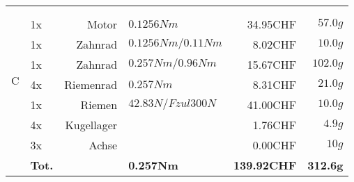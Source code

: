 \begin{longtable}{p{0.5cm}p{0.8cm}rp{3cm}rr}
    \multirow{9}[2]{*}{C} 
          &       &                 &                      &          &  \\
          &       &                 &                      &          &  \\
          & 1x    & Motor           & $0.1256 Nm$          & 34.95CHF & $57.0 g$ \\
          & 1x    & Zahnrad         & $0.1256 Nm / 0.11 Nm$& 8.02CHF  & $10.0 g$ \\
          & 1x    & Zahnrad         & $0.257 Nm / 0.96 Nm$ & 15.67CHF & $102.0 g$ \\
          & 4x    & Riemenrad       & $0.257 Nm$           & 8.31CHF  & $21.0 g$ \\
          & 1x    & Riemen          & $42.83 N /Fzul 300 N $ & 41.00CHF & $10.0 g$ \\
          & 4x    & Kugellager      &                      & 1.76CHF  & $4.9 g$ \\
          & 3x    & Achse           &                      & 0.00CHF  & $10 g$ \\
          & \textbf{Tot.} &       & \textbf{0.257Nm} & \textbf{139.92CHF} & \textbf{312.6g} \\
    \end{longtable}%
